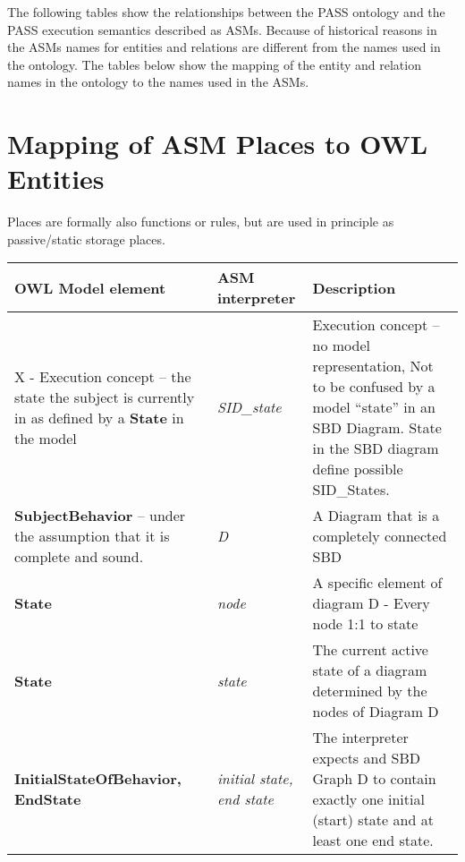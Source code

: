 The following tables show the relationships between the PASS ontology and the PASS execution semantics described as ASMs.
Because of historical reasons in the ASMs names for entities and relations are different from the names used in the ontology.
The tables below show the mapping of the entity and relation names in the ontology to the names used in the ASMs.

\section{Mapping of ASM Places to OWL Entities}
Places are formally also functions or rules, but are used in principle as passive/static storage places.

\footnotesize

\begin{landscape}
	\begin {longtable} {| p{} | p{} | p{}|}
	\hline
	OWL Model element &   ASM interpreter & Description\\
	\toprule
	\endhead
	\hline
	
	X - Execution concept – the state the subject is currently in as defined by a \textbf{State} in the model 
	& \textit{SID\_state} 
	&  Execution concept – no model representation, Not to be confused by a model “state” in an SBD Diagram. State in the SBD diagram define possible SID\_States.
	\\
	\hline
	
	\textbf{SubjectBehavior }	– under the assumption that it is complete and sound.
	& \textit{D} 
	&  A Diagram that is a completely connected SBD
	\\
	\hline
	
	\textbf{State}
	& \textit{node} 
	&  A specific element of diagram D -	Every node 1:1 to state
	\\
	\hline
	
	\textbf{State}
	& \textit{state} 
	& The current active state of a diagram determined by the nodes of Diagram D
	\\
	\hline
	
	\textbf{InitialStateOfBehavior, \newline EndState }
	& \textit{initial state, \newline end state} 
	& The interpreter expects and SBD Graph D to contain exactly one initial (start) state and at least one end state.
	\\
	\hline
	

\end{longtable}
\end{landscape}
